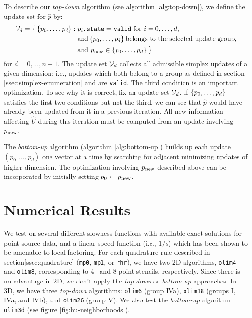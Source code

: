 \documentclass[smallcondensed]{svjour3}
\begin{document}
To describe our \emph{top-down} algorithm (see algorithm
\ref{alg:top-down}), we define the update set for $\hat{p}$ by:
\begin{equation}\label{eq:calU}
  \begin{aligned}
    \mathcal{V}_d = \big\{\left\{p_0, \hdots, p_d\right\}: \; &p_i\texttt{.state}=\texttt{valid} \mbox{ for } i = 0, \hdots, d, \\
    &\mbox{and} \left\{p_0, \hdots, p_d\right\} \mbox{belongs to the selected update group}, \\
    &\mbox{and } p_{\operatorname{new}} \in \left\{p_0, \hdots, p_d\right\} \big\}
  \end{aligned}
\end{equation}
for $d = 0, \hdots, n - 1$. The update set $\mathcal{V}_d$ collects all
admissible simplex updates of a given dimension: i.e., updates which
both belong to a group as defined in section\@
\ref{ssec:simplex-enumeration} and are \texttt{valid}. The third
condition is an important optimization. To see why it is correct, fix
an update set $\mathcal{V}_d$. If $\left\{p_0, \hdots, p_d\right\}$ satisfies the
first two conditions but not the third, we can see that $\hat{p}$
would have already been updated from it in a previous iteration. All
new information affecting $\hat{U}$ during this iteration must be
computed from an update involving $p_{\operatorname{new}}$.

The \emph{bottom-up} algorithm (algorithm \ref{alg:bottom-up}) builds up each
update $(p_0, \hdots, p_d)$ one vector at a time by searching for
adjacent minimizing updates of higher dimension. The optimization
involving $p_{\operatorname{new}}$ described above can be incorporated by initially
setting $p_0 \gets p_{\operatorname{new}}$.

\section{Numerical Results}\label{sec:numerical-results} We test on several different
slowness functions with available exact solutions for point source
data, and a linear speed function (i.e., $1/s$) which has been shown
to be amenable to local factoring. For each quadrature rule described
in section\@ \ref{ssec:quadrature} (\texttt{mp0}, \texttt{mp1}, or
\texttt{rhr}), we have two 2D algorithms, \texttt{olim4} and
\texttt{olim8}, corresponding to 4-\ and 8-point stencils,
respectively. Since there is no advantage in 2D, we don't apply the
\emph{top-down} or \emph{bottom-up} approaches. In 3D, we have three \emph{top-down}
algorithms: \texttt{olim6} (group IVa), \texttt{olim18} (groups I,
IVa, and IVb), and \texttt{olim26} (group V). We also test the
\emph{bottom-up} algorithm \texttt{olim3d} (see figure
\ref{fig:hu-neighborhoods}).
\end{document}
